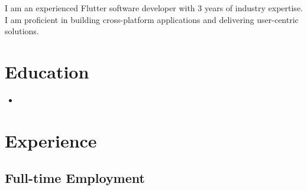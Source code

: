 \documentclass[11pt,a4paper,sans]{moderncv}
\begin{document}
\makecvtitle

\vspace{3pt}
I am an experienced Flutter software developer with 3 years of industry expertise. I am proficient in building cross-platform applications and delivering user-centric solutions. 

\section{Education}

\vspace{3pt}



\begin{itemize}

\item{}

\end{itemize}

\vspace{3pt}

\section{Experience}

\vspace{3pt}

\subsection{Full-time Employment}

\vspace{6pt}
\end{document}
